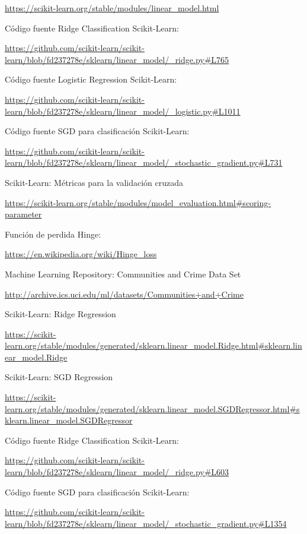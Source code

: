 \documentclass[12pt, spanish]{article}
\begin{document}
\begin{thebibliography}{9}
\url{https://scikit-learn.org/stable/modules/linear_model.html}


Código fuente Ridge Classification Scikit-Learn:

\url{https://github.com/scikit-learn/scikit-learn/blob/fd237278e/sklearn/linear_model/_ridge.py#L765}



Código fuente Logistic Regression Scikit-Learn:

\url{https://github.com/scikit-learn/scikit-learn/blob/fd237278e/sklearn/linear_model/_logistic.py#L1011}



Código fuente SGD para clasificación Scikit-Learn:

\url{https://github.com/scikit-learn/scikit-learn/blob/fd237278e/sklearn/linear_model/_stochastic_gradient.py#L731}



Scikit-Learn: Métricas para la validación cruzada

\url{https://scikit-learn.org/stable/modules/model_evaluation.html#scoring-parameter}


Función de perdida Hinge:

\url{https://en.wikipedia.org/wiki/Hinge_loss}


Machine Learning Repository: Communities and Crime Data Set  

\url{http://archive.ics.uci.edu/ml/datasets/Communities+and+Crime}




Scikit-Learn: Ridge Regression

\url{https://scikit-learn.org/stable/modules/generated/sklearn.linear_model.Ridge.html#sklearn.linear_model.Ridge}

Scikit-Learn: SGD Regression

\url{https://scikit-learn.org/stable/modules/generated/sklearn.linear_model.SGDRegressor.html#sklearn.linear_model.SGDRegressor}



Código fuente Ridge Classification Scikit-Learn:

\url{https://github.com/scikit-learn/scikit-learn/blob/fd237278e/sklearn/linear_model/_ridge.py#L603}



Código fuente SGD para clasificación Scikit-Learn:

\url{https://github.com/scikit-learn/scikit-learn/blob/fd237278e/sklearn/linear_model/_stochastic_gradient.py#L1354}


\end{thebibliography}
\end{document}
